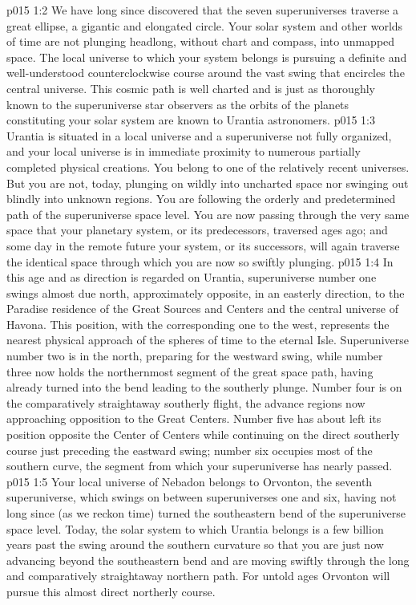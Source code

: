 \vs p015 1:2 We have long since discovered that the seven superuniverses traverse a great ellipse, a gigantic and elongated circle. Your solar system and other worlds of time are not plunging headlong, without chart and compass, into unmapped space. The local universe to which your system belongs is pursuing a definite and well\hyp{}understood counterclockwise course around the vast swing that encircles the central universe. This cosmic path is well charted and is just as thoroughly known to the superuniverse star observers as the orbits of the planets constituting your solar system are known to Urantia astronomers.
\vs p015 1:3 Urantia is situated in a local universe and a superuniverse not fully organized, and your local universe is in immediate proximity to numerous partially completed physical creations. You belong to one of the relatively recent universes. But you are not, today, plunging on wildly into uncharted space nor swinging out blindly into unknown regions. You are following the orderly and predetermined path of the superuniverse space level. You are now passing through the very same space that your planetary system, or its predecessors, traversed ages ago; and some day in the remote future your system, or its successors, will again traverse the identical space through which you are now so swiftly plunging.
\pc \vs p015 1:4 In this age and as direction is regarded on Urantia, superuniverse number one swings almost due north, approximately opposite, in an easterly direction, to the Paradise residence of the Great Sources and Centers and the central universe of Havona. This position, with the corresponding one to the west, represents the nearest physical approach of the spheres of time to the eternal Isle. Superuniverse number two is in the north, preparing for the westward swing, while number three now holds the northernmost segment of the great space path, having already turned into the bend leading to the southerly plunge. Number four is on the comparatively straightaway southerly flight, the advance regions now approaching opposition to the Great Centers. Number five has about left its position opposite the Center of Centers while continuing on the direct southerly course just preceding the eastward swing; number six occupies most of the southern curve, the segment from which your superuniverse has nearly passed.
\vs p015 1:5 Your local universe of Nebadon belongs to Orvonton, the seventh superuniverse, which swings on between superuniverses one and six, having not long since (as we reckon time) turned the southeastern bend of the superuniverse space level. Today, the solar system to which Urantia belongs is a few billion years past the swing around the southern curvature so that you are just now advancing beyond the southeastern bend and are moving swiftly through the long and comparatively straightaway northern path. For untold ages Orvonton will pursue this almost direct northerly course.
